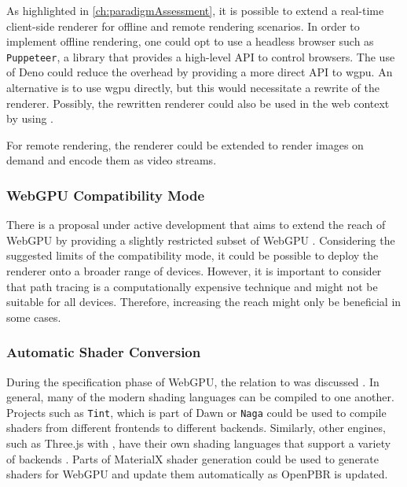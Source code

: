 As highlighted in \autoref{ch:paradigmAssessment}, it is possible to extend a real-time client-side renderer for offline and remote rendering scenarios. In order to implement offline rendering, one could opt to use a headless browser such as \texttt{Puppeteer}, a  library that provides a high-level \gls{API} to control browsers. The use of \gls{Deno} could reduce the overhead by providing a more direct \gls{API} to \gls{wgpu}. An alternative is to use \gls{wgpu} directly, but this would necessitate a rewrite of the renderer. Possibly, the rewritten renderer could also be used in the web context by using .

For remote rendering, the renderer could be extended to render images on demand and encode them as video streams.

\subsubsection*{WebGPU Compatibility Mode}

There is a proposal under active development that aims to extend the reach of \gls{WebGPU} by providing a slightly restricted subset of \gls{WebGPU} \cite{WebGPUCompatibilityModeProposal}. Considering the suggested limits of the compatibility mode, it could be possible to deploy the renderer onto a broader range of devices. However, it is important to consider that path tracing is a computationally expensive technique and might not be suitable for all devices. Therefore, increasing the reach might only be beneficial in some cases.

\subsubsection*{Automatic Shader Conversion}

During the specification phase of \gls{WebGPU}, the relation to  was discussed \cite{webGPUSpirVRelation}. In general, many of the modern shading languages can be compiled to one another. Projects such as \texttt{Tint}, which is part of \gls{Dawn} \cite{dawnImplementation} or \texttt{Naga} \cite{nagaImplementation} could be used to compile shaders from different frontends to different backends. Similarly, other engines, such as \gls{Three.js} with , have their own shading languages that support a variety of backends \cite{ThreeJSShadingLanguage}. Parts of \gls{MaterialX} shader generation could be used to generate shaders for \gls{WebGPU} and update them automatically as \gls{OpenPBR} is updated.

